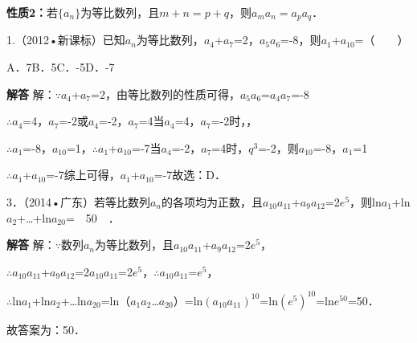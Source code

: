\par\medskip\noindent\textbf{性质2：}若$\{a_n\}$为等比数列，且$m+n=p+q$，则$a_ma_n=a_pa_q$．\par
{}
1.（2012•新课标）已知{\ensuremath{a_{n}}}为等比数列，\ensuremath{a_{4}}+\ensuremath{a_{7}}=2，\ensuremath{a_{5}}\ensuremath{a_{6}}=-8，则\ensuremath{a_{1}}+\ensuremath{a_{10}}=（　　）\par
\qquad{}\qquad{}\qquad{}A．7\qquad{}B．5\qquad{}C．-5\qquad{}D．-7\qquad{}\par
\QuestionSpace{1.2cm}
\ifshowanswers
\par\begingroup\color{solutioncolor}\noindent\textbf{解答}\quad
解：\ensuremath{\because}\ensuremath{a_{4}}+\ensuremath{a_{7}}=2，由等比数列的性质可得，\ensuremath{a_{5}}\ensuremath{a_{6}}=\ensuremath{a_{4}}\ensuremath{a_{7}}=-8\par
\ensuremath{\therefore}\ensuremath{a_{4}}=4，\ensuremath{a_{7}}=-2或\ensuremath{a_{4}}=-2，\ensuremath{a_{7}}=4当\ensuremath{a_{4}}=4，\ensuremath{a_{7}}=-2时，，\par
\ensuremath{\therefore}\ensuremath{a_{1}}=-8，\ensuremath{a_{10}}=1，\ensuremath{\therefore}\ensuremath{a_{1}}+\ensuremath{a_{10}}=-7当\ensuremath{a_{4}}=-2，\ensuremath{a_{7}}=4时，\ensuremath{q^{3}}=-2，则\ensuremath{a_{10}}=-8，\ensuremath{a_{1}}=1\par
\ensuremath{\therefore}\ensuremath{a_{1}}+\ensuremath{a_{10}}=-7综上可得，\ensuremath{a_{1}}+\ensuremath{a_{10}}=-7故选：D．\par
\par\endgroup\fi

3．（2014•广东）若等比数列{\ensuremath{a_{n}}}的各项均为正数，且\ensuremath{a_{10}}\ensuremath{a_{11}}+\ensuremath{a_{9}}\ensuremath{a_{12}}=2\ensuremath{e^{5}}，则ln\ensuremath{a_{1}}+ln\ensuremath{a_{2}}+\ldots{}+ln\ensuremath{a_{20}}=　50　．\par
\QuestionSpace{2.5cm}
\ifshowanswers
\par\begingroup\color{solutioncolor}\noindent\textbf{解答}\quad
解：\ensuremath{\because}数列{\ensuremath{a_{n}}}为等比数列，且\ensuremath{a_{10}}\ensuremath{a_{11}}+\ensuremath{a_{9}}\ensuremath{a_{12}}=2\ensuremath{e^{5}}，\par
\ensuremath{\therefore}\ensuremath{a_{10}}\ensuremath{a_{11}}+\ensuremath{a_{9}}\ensuremath{a_{12}}=2\ensuremath{a_{10}}\ensuremath{a_{11}}=2\ensuremath{e^{5}}，\ensuremath{\therefore}\ensuremath{a_{10}}\ensuremath{a_{11}}=\ensuremath{e^{5}}，\par
\ensuremath{\therefore}ln\ensuremath{a_{1}}+ln\ensuremath{a_{2}}+\ldots{}ln\ensuremath{a_{20}}=ln（\ensuremath{a_{1}}\ensuremath{a_{2}}\ldots{}\ensuremath{a_{20}}）=ln\ensuremath{(a_{10}a_{11})^{10}}=ln\ensuremath{(e^{5})^{10}}=ln\ensuremath{e^{50}}=50．\par
故答案为：50．\par
\par\endgroup\fi

